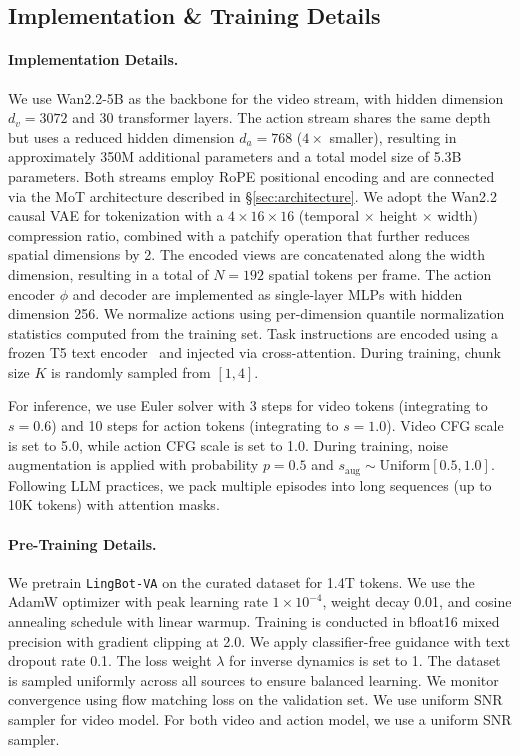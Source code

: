 \documentclass[onecolumn]{robbyant}           %
\newcommand\methodname{LingBot-VA}
\newcommand{\method}{\texttt{\methodname}\xspace}
\begin{document}
\subsection{Implementation \& Training Details}

\paragraph{Implementation Details.}
We use Wan2.2-5B as the backbone for the video stream, with hidden dimension $d_v = 3072$ and 30 transformer layers.
The action stream shares the same depth but uses a reduced hidden dimension $d_a = 768$ ($4\times$ smaller), resulting in approximately 350M additional parameters and a total model size of 5.3B parameters.
Both streams employ RoPE positional encoding and are connected via the MoT architecture described in \S\ref{sec:architecture}.
We adopt the Wan2.2 causal VAE for tokenization with a $4\times 16\times 16$ (temporal $\times$ height $\times$ width) compression ratio, combined with a patchify operation that further reduces spatial dimensions by 2. The encoded views are concatenated along the width dimension, resulting in a total of $N = 192$ spatial tokens per frame.
The action encoder $\phi$ and decoder are implemented as single-layer MLPs with hidden dimension 256.
We normalize actions using per-dimension quantile normalization statistics computed from the training set.
Task instructions are encoded using a frozen T5 text encoder~\cite{raffel2020exploring} and injected via cross-attention.
During training, chunk size $K$ is randomly sampled from $[1, 4]$.

For inference, we use Euler solver with 3 steps for video tokens (integrating to $s = 0.6$) and 10 steps for action tokens (integrating to $s = 1.0$).
Video CFG scale is set to 5.0, while action CFG scale is set to 1.0.
During training, noise augmentation is applied with probability $p = 0.5$ and $s_{\text{aug}} \sim \text{Uniform}[0.5, 1.0]$.
Following LLM practices, we pack multiple episodes into long sequences (up to 10K tokens) with attention masks.

\paragraph{Pre-Training Details.}
We pretrain \method on the curated dataset for 1.4T tokens.
We use the AdamW optimizer with peak learning rate $1 \times 10^{-4}$, weight decay 0.01, and cosine annealing schedule with linear warmup.
Training is conducted in bfloat16 mixed precision with gradient clipping at 2.0.
We apply classifier-free guidance with text dropout rate 0.1.
The loss weight $\lambda$ for inverse dynamics is set to 1.
The dataset is sampled uniformly across all sources to ensure balanced learning.
We monitor convergence using flow matching loss on the validation set.
We use uniform SNR sampler for video model.
For both video and action model, we use a uniform SNR sampler.
\end{document}
